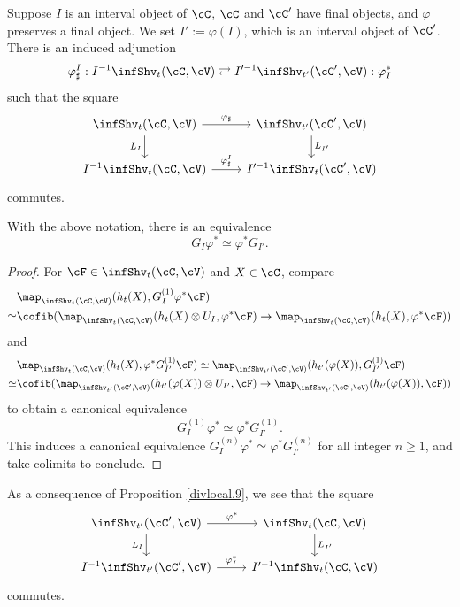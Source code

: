 \documentclass[10pt]{amsart}
\begin{document}
Suppose $I$ is an interval object of $\cC$, $\cC$ and $\cC'$ have final objects, and $\varphi$ preserves a final object.
We set $I':=\varphi(I)$, which is an interval object of $\cC'$.
There is an induced adjunction
\begin{equation}
\varphi_\sharp^I : I^{-1}\infShv_t(\cC,\cV)\rightleftarrows I'^{-1}\infShv_{t'}(\cC',\cV) : \varphi_I^*
\end{equation}
such that the square
\begin{equation}
\begin{tikzcd}
\infShv_t(\cC,\cV)\ar[d,"L_I"']\ar[r,"\varphi_\sharp"]&
\infShv_{t'}(\cC',\cV)\ar[d,"L_{I'}"]
\\
I^{-1}\infShv_t(\cC,\cV)\ar[r,"\varphi_\sharp^I"]&
I'^{-1}\infShv_t(\cC',\cV)
\end{tikzcd}
\end{equation}
commutes.

\begin{prop}
\label{divlocal.9}
With the above notation, 
there is an equivalence
\[
G_I\varphi^*
\simeq
\varphi^* G_{I'}.
\]
\end{prop}
\begin{proof}
For $\cF\in \infShv_t(\cC,\cV)$ and $X\in \cC$, compare
\begin{align*}
& \map_{\infShv_t(\cC,\cV)}(h_t(X),G_I^{(1)}\varphi^*\cF)
\\
\simeq &
\cofib(
\map_{\infShv_t(\cC,\cV)}(h_t(X)\otimes U_I,\varphi^*\cF)
\to
\map_{\infShv_t(\cC,\cV)}(h_t(X),\varphi^*\cF))
\end{align*}
and
\begin{align*}
& \map_{\infShv_t(\cC,\cV)}(h_t(X),\varphi^*G_{I'}^{(1)}\cF)
\simeq 
\map_{\infShv_{t'}(\cC',\cV)}(h_{t'}(\varphi(X)),G_{I'}^{(1)}\cF)
\\
\simeq &
\cofib(
\map_{\infShv_{t'}(\cC',\cV)}(h_{t'}(\varphi(X))\otimes U_{I'},\cF)
\to
\map_{\infShv_{t'}(\cC',\cV)}(h_{t'}(\varphi(X)),\cF))
\end{align*}
to obtain a canonical equivalence
\[
G_I^{(1)}\varphi^*
\simeq
\varphi^* G_{I'}^{(1)}.
\]
This induces a canonical equivalence $G_I^{(n)}\varphi^* \simeq \varphi^* G_{I'}^{(n)}$ for all integer $n\geq 1$, and take colimits to conclude.
\end{proof}

As a consequence of Proposition \ref{divlocal.9}, we see that the square
\begin{equation}
\label{divlocal.9.1}
\begin{tikzcd}
\infShv_{t'}(\cC',\cV)\ar[d,"L_I"']\ar[r,"\varphi^*"]&
\infShv_{t}(\cC,\cV)\ar[d,"L_{I'}"]
\\
I^{-1}\infShv_{t'}(\cC',\cV)\ar[r,"\varphi_I^*"]&
I'^{-1}\infShv_t(\cC,\cV)
\end{tikzcd}
\end{equation}
commutes.
\end{document}
